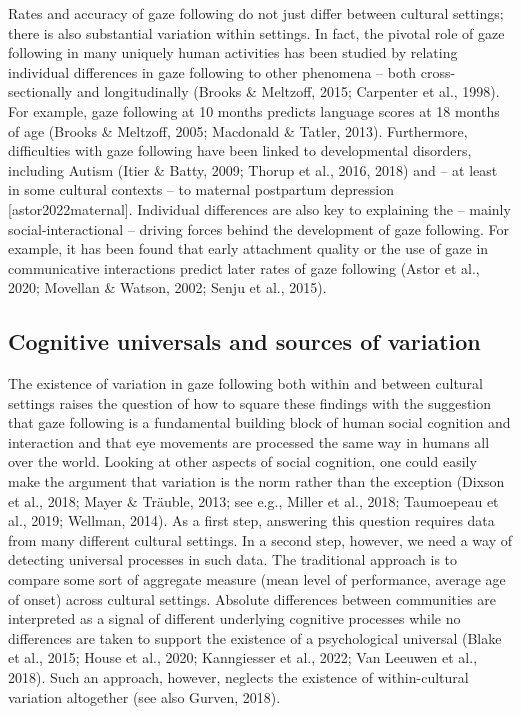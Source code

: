 \documentclass[
  man,floatsintext]{apa7}
\begin{document}
Rates and accuracy of gaze following do not just differ between cultural settings; there is also substantial variation within settings. In fact, the pivotal role of gaze following in many uniquely human activities has been studied by relating individual differences in gaze following to other phenomena -- both cross-sectionally and longitudinally (Brooks \& Meltzoff, 2015; Carpenter et al., 1998). For example, gaze following at 10 months predicts language scores at 18 months of age (Brooks \& Meltzoff, 2005; Macdonald \& Tatler, 2013). Furthermore, difficulties with gaze following have been linked to developmental disorders, including Autism (Itier \& Batty, 2009; Thorup et al., 2016, 2018) and -- at least in some cultural contexts -- to maternal postpartum depression {[}astor2022maternal{]}. Individual differences are also key to explaining the -- mainly social-interactional -- driving forces behind the development of gaze following. For example, it has been found that early attachment quality or the use of gaze in communicative interactions predict later rates of gaze following (Astor et al., 2020; Movellan \& Watson, 2002; Senju et al., 2015).

\hypertarget{cognitive-universals-and-sources-of-variation}{%
\subsection{Cognitive universals and sources of variation}\label{cognitive-universals-and-sources-of-variation}}

The existence of variation in gaze following both within and between cultural settings raises the question of how to square these findings with the suggestion that gaze following is a fundamental building block of human social cognition and interaction and that eye movements are processed the same way in humans all over the world. Looking at other aspects of social cognition, one could easily make the argument that variation is the norm rather than the exception (Dixson et al., 2018; Mayer \& Träuble, 2013; see e.g., Miller et al., 2018; Taumoepeau et al., 2019; Wellman, 2014). As a first step, answering this question requires data from many different cultural settings. In a second step, however, we need a way of detecting universal processes in such data. The traditional approach is to compare some sort of aggregate measure (mean level of performance, average age of onset) across cultural settings. Absolute differences between communities are interpreted as a signal of different underlying cognitive processes while no differences are taken to support the existence of a psychological universal (Blake et al., 2015; House et al., 2020; Kanngiesser et al., 2022; Van Leeuwen et al., 2018). Such an approach, however, neglects the existence of within-cultural variation altogether (see also Gurven, 2018).
\end{document}
